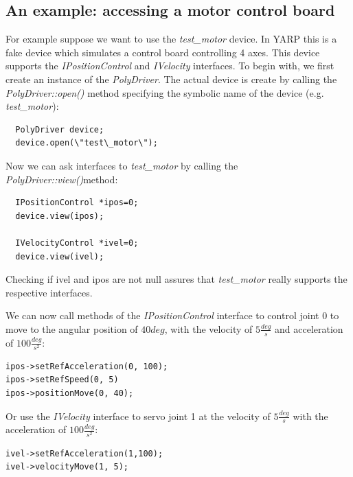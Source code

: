\subsection{An example: accessing a motor control board}
For example suppose we want to use the \emph{test\_motor} device. In 
YARP this is a fake device which simulates a control board controlling 
4 axes. This device supports the \emph{IPositionControl} and 
\emph{IVelocity} interfaces. To begin with, we first create an 
instance of the \emph{PolyDriver}. The actual device is create by 
calling the \emph{PolyDriver::open()} method specifying the symbolic 
name of the device (e.g. \emph{test\_motor}):

\begin{verbatim}
  PolyDriver device;
  device.open(\"test\_motor\");
\end{verbatim}

Now we can ask interfaces to \emph{test\_motor} by calling the 
\emph{PolyDriver::view()}method:

\begin{verbatim}
  IPositionControl *ipos=0;
  device.view(ipos);

  IVelocityControl *ivel=0;
  device.view(ivel);
\end{verbatim}

Checking if ivel and ipos are not null assures that \emph{test\_motor} 
really supports the respective interfaces.

We can now call methods of the \emph{IPositionControl} interface to control 
joint $0$ to move to the angular position of $40deg$, with the velocity 
of $5\frac{deg}{s}$ and acceleration of $100\frac{deg}{s^2}$:

\begin{verbatim}
ipos->setRefAcceleration(0, 100);
ipos->setRefSpeed(0, 5)
ipos->positionMove(0, 40);
\end{verbatim}

Or use the \emph{IVelocity} interface to servo joint 1 at the velocity 
of $5\frac{deg}{s}$ with the acceleration of $100\frac{deg}{s^2}$:

\begin{verbatim}
ivel->setRefAcceleration(1,100);
ivel->velocityMove(1, 5);
\end{verbatim}

